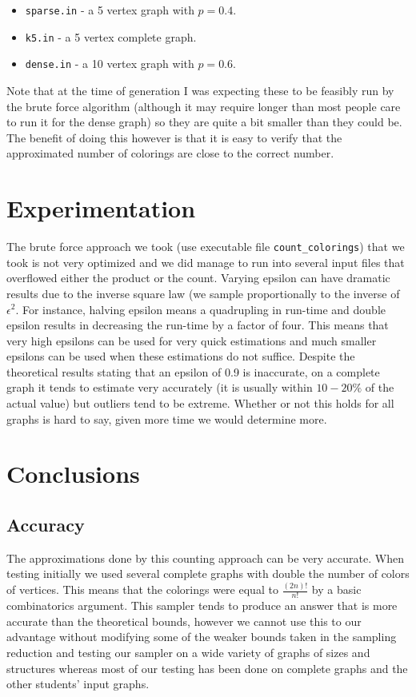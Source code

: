 \documentclass[14]{article}
\begin{document}
\begin{itemize}
\item \texttt{sparse.in} - a 5 vertex graph with $p=0.4$.
\item \texttt{k5.in} - a 5 vertex complete graph.
\item \texttt{dense.in} - a 10 vertex graph with $p=0.6$.
\end{itemize}
Note that at the time of generation I was expecting these to be feasibly run by the brute force algorithm (although it may require longer than most people care to run it for the dense graph) so they are quite a bit smaller than they could be. The benefit of doing this however is that it is easy to verify that the approximated number of colorings are close to the correct number.
\section{Experimentation}
The brute force approach we took (use executable file \texttt{count\_colorings}) that we took is not very optimized and we did manage to run into several input files that overflowed either the product or the count.
Varying epsilon can have dramatic results due to the inverse square law (we sample proportionally to the inverse of $\epsilon^2$. For instance, halving epsilon means a quadrupling in run-time and double epsilon results in decreasing the run-time by a factor of four. This means that very high epsilons can be used for very quick estimations and much smaller epsilons can be used when these estimations do not suffice. Despite the theoretical results stating that an epsilon of 0.9 is inaccurate, on a complete graph it tends to estimate very accurately (it is usually within $10-20\%$ of the actual value) but outliers tend to be extreme. Whether or not this holds for all graphs is hard to say, given more time we would determine more.
\section{Conclusions}
\subsection{Accuracy}
The approximations done by this counting approach can be very accurate. When testing initially we used several complete graphs with double the number of colors of vertices. This means that the colorings were equal to $\frac{(2n)!}{n!}$ by a basic combinatorics argument. This sampler tends to produce an answer that is more accurate than the theoretical bounds, however we cannot use this to our advantage without modifying some of the weaker bounds taken in the sampling reduction and testing our sampler on a wide variety of graphs of sizes and structures whereas most of our testing has been done on complete graphs and the other students' input graphs.
\end{document}
